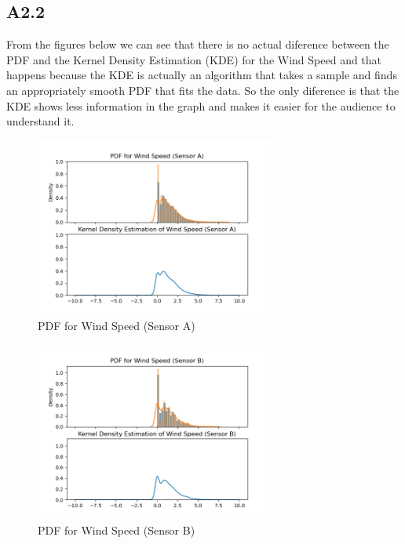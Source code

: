 \documentclass[a4paper,12pt]{article}
\begin{document}
 \subsection{A2.2}
 From the figures below we can see that there is no actual diference between the PDF and the Kernel Density Estimation (KDE) for the Wind Speed and that happens because the KDE is actually an algorithm that takes a sample
 and finds an appropriately smooth PDF that fits the data. So the only diference is that the KDE shows less information in the graph and makes it easier for the audience to understand it.
  \begin{figure}[H] 
	\centering
	\includegraphics[width=0.7\textwidth]{PDF for Wind Speed (Sensor A).png}
	\caption{PDF for Wind Speed (Sensor A)\cite{Maiullari2020}}
  \end{figure}
  \begin{figure}[H] 
	\centering
	\includegraphics[width=0.7\textwidth]{PDF for Wind Speed (Sensor B).png}
	\caption{PDF for Wind Speed (Sensor B)\cite{Maiullari2020}}
  \end{figure}
\end{document}
